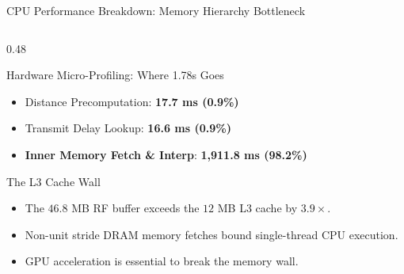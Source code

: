 \documentclass[aspectratio=169,10pt]{beamer}
\begin{document}
\begin{frame}{CPU Performance Breakdown: Memory Hierarchy Bottleneck}
\begin{columns}[T]
\begin{column}{0.48\textwidth}
\begin{block}{Hardware Micro-Profiling: Where 1.78s Goes}
        \scriptsize
        \begin{itemize}
          \item Distance Precomputation: \textbf{17.7 ms (0.9\%)}
          \item Transmit Delay Lookup: \textbf{16.6 ms (0.9\%)}
          \item \textbf{Inner Memory Fetch \& Interp}: \textbf{1,911.8 ms (98.2\%)}
        \end{itemize}
      \end{block}
      \begin{alertblock}{The L3 Cache Wall}
        \scriptsize
        \begin{itemize}
          \item The $46.8$ MB RF buffer exceeds the $12$ MB L3 cache by \textbf{$3.9\times$}.
          \item Non-unit stride DRAM memory fetches bound single-thread CPU execution.
          \item GPU acceleration is essential to break the memory wall.
        \end{itemize}
      \end{alertblock}
    \end{column}
  \end{columns}
\end{frame}
\end{document}
